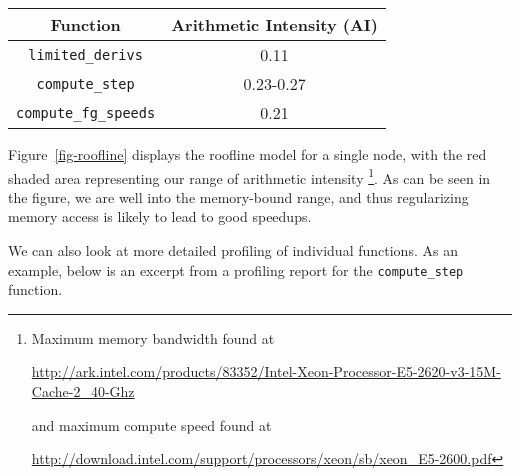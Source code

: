 \begin{center}
\begin{tabular}{ |c|c| } 
 \hline
 Function & Arithmetic Intensity (AI) \\ 
 \hline
 \texttt{limited\_derivs} & 0.11 \\ 
 \texttt{compute\_step} & 0.23-0.27 \\ 
 \texttt{compute\_fg\_speeds} & 0.21 \\ 
 \hline
\end{tabular}
\end{center}

Figure~\ref{fig-roofline} displays the roofline model for a single node, with the red
shaded area representing our range of arithmetic intensity
\footnote{Maximum memory bandwidth found at 

\url{http://ark.intel.com/products/83352/Intel-Xeon-Processor-E5-2620-v3-15M-Cache-2_40-Ghz} 

and maximum compute speed found at 

\url{http://download.intel.com/support/processors/xeon/sb/xeon_E5-2600.pdf}}.
As can be seen in the figure, we are well into the memory-bound range, and thus 
regularizing memory access is likely to lead to good speedups.



We can also look at more detailed profiling of individual functions.
As an example, below is an excerpt from a profiling report for the 
\texttt{compute\_step} function.

